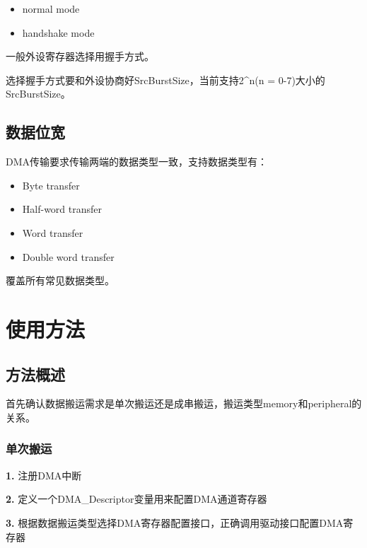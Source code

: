 \documentclass[
  12pt,
]{book}
\begin{document}
\begin{itemize}
\item
  normal mode
\item
  handshake mode
\end{itemize}

一般外设寄存器选择用握手方式。

选择握手方式要和外设协商好SrcBurstSize，当前支持2\^{}n(n = 0-7)大小的SrcBurstSize。

\hypertarget{ux6570ux636eux4f4dux5bbd}{%
\subsection{数据位宽}\label{ux6570ux636eux4f4dux5bbd}}

DMA传输要求传输两端的数据类型一致，支持数据类型有：

\begin{itemize}
\item
  Byte transfer
\item
  Half-word transfer
\item
  Word transfer
\item
  Double word transfer
\end{itemize}

覆盖所有常见数据类型。

\hypertarget{ux4f7fux7528ux65b9ux6cd5}{%
\section{使用方法}\label{ux4f7fux7528ux65b9ux6cd5}}

\hypertarget{ux65b9ux6cd5ux6982ux8ff0}{%
\subsection{方法概述}\label{ux65b9ux6cd5ux6982ux8ff0}}

首先确认数据搬运需求是单次搬运还是成串搬运，搬运类型memory和peripheral的关系。

\hypertarget{ux5355ux6b21ux642cux8fd0}{%
\subsubsection{单次搬运}\label{ux5355ux6b21ux642cux8fd0}}

\textbf{1.} 注册DMA中断

\textbf{2.} 定义一个DMA\_Descriptor变量用来配置DMA通道寄存器

\textbf{3.} 根据数据搬运类型选择DMA寄存器配置接口，正确调用驱动接口配置DMA寄存器
\end{document}
